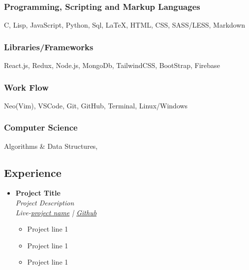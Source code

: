 \documentclass[11pt, oneside, a4paper, titlepage]{article}
\begin{document}
\begin{tcolorbox}
\begin{minipage}[t]{8cm}
\begin{tcolorbox}[grow to left by=0.6cm,colback=gray!25,colframe=white]
        \subsubsection{Programming, Scripting and Markup Languages}
        C, Lisp, JavaScript, Python, Sql, {\LaTeX}, HTML, CSS, SASS/LESS, Markdown

        \subsubsection{Libraries/Frameworks}
        React.js, Redux, Node.js, MongoDb, TailwindCSS, BootStrap, Firebase

        \subsubsection{Work Flow}
        Neo(Vim), VSCode, Git, GitHub, Terminal, Linux/Windows

        \subsubsection{Computer Science}
        Algorithms \& Data Structures, 
    \end{tcolorbox}
  \end{minipage}
  \begin{minipage}[t]{11cm}
    \vspace*{-0.5cm}
    \begin{tcolorbox}[grow to right by=0.75cm,colframe=white,colback=white]
      \section*{Experience}
      \begin{itemize}
        \item
        {
          \textbf{Project Title} \\
          \textit{Project Description} \\
          \textit{Live-\href{url}{project name} | \href{https://github.com/SazedWorldbringer}{Github}} \\
          \vspace*{-0.7cm}
          \begin{itemize}
            \item Project line 1
            \item Project line 1
            \item Project line 1
          \end{itemize}
        }


\end{itemize}
\end{tcolorbox}
\end{minipage}
\end{tcolorbox}
\end{document}

